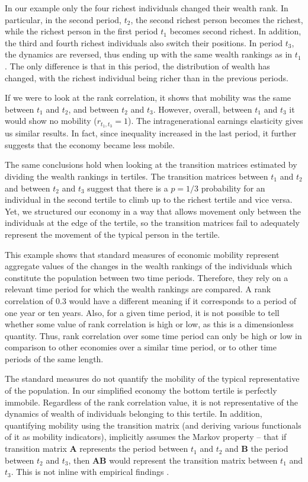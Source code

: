 \documentclass[11pt]{article}
\numberwithin{equation}{section}
\begin{document}
In our example only the four richest individuals changed their wealth rank. In particular, in the second period, $t_2$, the second richest person becomes the richest, while the richest person in the first period $t_1$ becomes second richest. In addition, the third and fourth richest individuals also switch their positions. In period $t_3$, the dynamics are reversed, thus ending up with the same wealth rankings as in $t_1$. The only difference is that in this period, the distribution of wealth has changed, with the richest individual being richer than in the previous periods.

If we were to look at the rank correlation, it shows that mobility was the same between $t_1$ and $t_2$, and between $t_2$ and $t_3$. However, overall, between $t_1$ and $t_3$ it would show no mobility ($r_{t_1,t_3} = 1$). The intragenerational earnings elasticity gives us similar results. In fact, since inequality increased in the last period, it further suggests that the economy became less mobile. 

The same conclusions hold when looking at the transition matrices estimated by dividing the wealth rankings in tertiles. The transition matrices between $t_1$ and $t_2$ and between $t_2$ and $t_3$ suggest that there is a $p=1/3$ probability for an individual in the second tertile to climb up to the richest tertile and vice versa. Yet, we structured our economy in a way that allows movement only between the individuals at the edge of the tertile, so the transition matrices fail to adequately represent the movement of the typical person in the tertile.

This example shows that standard measures of economic mobility represent aggregate values of the changes in the wealth rankings of the individuals which constitute the population between two time periods. Therefore, they rely on a relevant time period for which the wealth rankings are compared. A rank correlation of 0.3 would have a different meaning if it corresponds to a period of one year or ten years. Also, for a given time period, it is not possible to tell whether some value of rank correlation is high or low, as this is a dimensionless quantity. Thus, rank correlation over some time period can only be high or low in comparison to other economies over a similar time period, or to other time periods of the same length.

The standard measures do not quantify the mobility of the typical representative of the population. In our simplified economy the bottom tertile is perfectly immobile. Regardless of the rank correlation value, it is not representative of the dynamics of wealth of individuals belonging to this tertile. In addition, quantifying mobility using the transition matrix (and deriving various functionals of it as mobility indicators), implicitly assumes the Markov property -- that if transition matrix $\mathbf{A}$ represents the period between $t_1$ and $t_2$ and $\mathbf{B}$ the period between $t_2$ and $t_3$, then $\mathbf{A B}$ would represent the transition matrix between $t_1$ and $t_3$. This is not inline with empirical findings \citep{Mcfarland1970,Shorrocks1978,Clark2015}.
\end{document}
